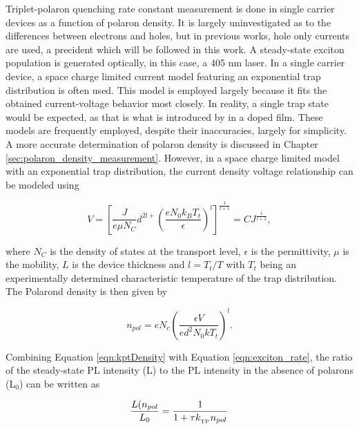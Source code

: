 \documentclass[../thesis.tex]{subfiles}
\begin{document}
Triplet-polaron quenching rate constant measurement is done in single carrier devices as a function of polaron density.  
It is largely uninvestigated as to the differences between electrons and holes, but in previous works, hole only currents are used, a precident which will be followed in this work.\supercite{Erickson2014,Reineke2007}
A steady-state exciton population is generated optically, in this case, a 405 nm laser.  
In a single carrier device, a space charge limited current model featuring an exponential trap distribution is often used.\supercite{Lampert2002a,Giebink2009a,Pope1999}
This model is employed largely because it fits the obtained current-voltage behavior most closely.  
In reality, a single trap state would be expected, as that is what is introduced by \irppy in a doped film.  
These models are frequently employed, despite their inaccuracies, largely for simplicity.  A more accurate determination of polaron density is discussed in Chapter \ref{sec:polaron_density_measurement}.
However, in a space charge limited model with an exponential trap distribution, the current density voltage relationship can be modeled using

\begin{equation}
V=\left[ \frac{J}{e\mu N_C}d^{2l+}\left( \frac{eN_0k_BT_t}{\epsilon} \right)^l \right]^{\frac{1}{l+1}}=CJ^{\frac{1}{l+1}},
\label{eqn:ktpVoltage}
\end{equation}

where $N_C$ is the density of states at the transport level, $\epsilon$ is the permittivity, $\mu$ is the mobility, $L$ is the device thickness and $l=T_t/T$ with $T_t$ being an experimentally determined characteristic temperature of the trap distribution.  The Polarond density is then given by

\begin{equation}
n_{pol}=eN_c\left(\frac{\epsilon V}{ed^2N_0kT_t}\right)^l.
\label{eqn:kptDensity}
\end{equation}

Combining Equation \ref{eqn:kptDensity} with Equation \ref{eqn:exciton_rate}, the ratio of the steady-state PL intensity (L) to the PL intensity in the absence of polarons (L$_0$) can be written as\supercite{Reineke2007}

\begin{equation}
\frac{L(n_{pol}}{L_0}=\frac{1}{1+\tau k_{_\text{\tiny TP}} n_{pol}}
\label{eqn:ktpFit}
\end{equation}
\end{document}
